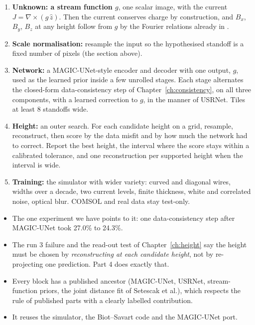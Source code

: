\begin{enumerate}
\item \textbf{Unknown: a stream function $g$}, one scalar image, with the current $J=\nabla\times(g\,\hat z)$. Then the
current conserves charge by construction, and $B_x$, $B_y$, $B_z$ at any height follow from $g$ by the Fourier relations
already in .
\item \textbf{Scale normalisation:} resample the input so the hypothesised standoff is a fixed number of pixels (the
section above).
\item \textbf{Network:} a MAGIC-UNet-style encoder and decoder with one output, $g$, used as the learned prior inside a few
unrolled stages. Each stage alternates the closed-form data-consistency step of Chapter~\ref{ch:consistency}, on all
three components, with a learned correction to $g$, in the manner of USRNet. Tiles at least 8 standoffs wide.
\item \textbf{Height:} an outer search. For each candidate height on a grid, resample, reconstruct, then score by the data
misfit and by how much the network had to correct. Report the best height, the interval where the score stays within
a calibrated tolerance, and one reconstruction per supported height when the interval is wide.
\item \textbf{Training:} the simulator with wider variety: curved and diagonal wires, widths over a decade, two current
levels, finite thickness, white and correlated noise, optical blur. COMSOL and real data stay test-only.
\end{enumerate}

\begin{keyidea}
\begin{itemize}
\item The one experiment we have points to it: one data-consistency step after MAGIC-UNet took 27.0\% to 24.3\%.
\item The run 3 failure and the read-out test of Chapter~\ref{ch:height} say the height must be chosen by
\emph{reconstructing at each candidate height}, not by re-projecting one prediction. Part 4 does exactly that.
\item Every block has a published ancestor (MAGIC-UNet, USRNet, stream-function priors, the joint distance fit of
Setescak et al.), which respects the rule of published parts with a clearly labelled contribution.
\item It reuses the simulator, the Biot--Savart code and the MAGIC-UNet port.
\end{itemize}
\end{keyidea}

